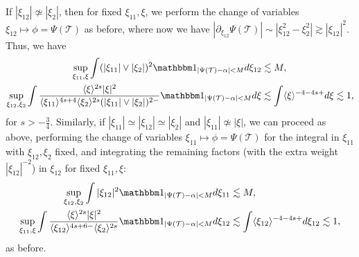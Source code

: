 \documentclass[a4paper,
11pt,  reqno]{amsart}
\newcommand{\5}{\textup{V}}
\newcommand{\ind}{\mathbbm 1}
\newcommand{\les}{\lesssim}
\theoremstyle{remark}
\newcommand{\TT}{\mathcal{T}}
\newcommand{\al}{\alpha}
\newcommand{\ges}{\gtrsim}
\newcommand{\jb}[1]
{\langle #1 \rangle}
\numberwithin{equation}{section}
\numberwithin{theorem}{section}
\begin{document}
If $|\xi_{12}| \not \simeq |\xi_2|$, then for fixed $\xi_{11}, \xi$, we perform the change of variables $\xi_{12} \mapsto \phi = \Psi(\TT)$ as before, where now we have 
$|\partial_{\xi_{12}} \Psi(\TT) | \sim |\xi_{12}^2 - \xi_2^2| \ges |\xi_{12}|^2$.
Thus, we have 
\begin{align}
    \sup_{\xi_{11}, \xi} \int 
(|\xi_{11}| \lor |\xi_2|)^2 \ind_{|\Psi(\TT) - \al| < M } d \xi_{12}
    &
    \les M
    , 
    \\
    \sup_{\xi_{12}, \xi_2} 
    \int 
    \frac{\jb{\xi}^{2s} |\xi|^2 }{\jb{\xi_{11}}^{4s+4} \jb{\xi_2}^{2s} (|\xi_{11}| \lor |\xi_2|)^{2-}} \ind_{|\Psi(\TT) - \al| < M } 
    d\xi
    &
    \les \int \jb{\xi}^{-4-4s+} d\xi \les 1 , 
\end{align}
for $s>-\frac34$.  
Similarly, 
if $|\xi_{11}|\simeq |\xi_{12}| \simeq |\xi_2|$ and $|\xi_{11}| \not \simeq |\xi|$, we can proceed as above, performing the change of variables $\xi_{11} \mapsto \phi = \Psi(\TT)$ for the integral in $\xi_{11}$ with $\xi_{12},\xi_2$ fixed, and integrating the remaining factors (with the extra weight $|\xi_{12}|^{-2}$) in $\xi_{12}$ for fixed $\xi_{11},\xi$:
\begin{align}
    \sup_{\xi_{12}, \xi_2} \int |\xi_{12}|^2 \ind_{|\Psi(\TT) - \al| < M } d\xi_{11} 
    & \les M 
    ,
    \\
    \sup_{\xi_{11}, \xi} \int \frac{\jb{\xi}^{2s} |\xi|^2 }{\jb{\xi_{12}}^{4s+6 -} \jb{\xi_2}^{2s}} \ind_{|\Psi(\TT) - \al| < M } d\xi_{12 } 
    &
    \les 
    \int \jb{\xi_{12}}^{-4-4s+} d\xi_{12} \les 1, 
\end{align}
as before.
\end{document}

